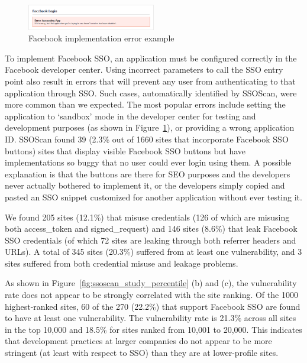 \begin{figure}[bth]
\centering
\includegraphics[width=0.5\textwidth]{figures/chapter4/ssoscan_study_FBError.png}
\caption{Facebook implementation error example}
\label{fig:ssoscan_study_FBError}
\end{figure}

 To implement Facebook SSO, an application must be configured correctly in the Facebook developer center.  Using incorrect parameters to call the SSO entry point also result in errors that will prevent any user from authenticating to that application through SSO.  Such cases, automatically identified by SSOScan, were more common than we expected.  The most popular errors include setting the application to `sandbox' mode in the developer center for testing and development purposes (as shown in Figure~\ref{fig:ssoscan_study_FBError}), or providing a wrong application ID.  SSOScan found 39 (2.3\% out of 1660 sites that incorporate Facebook SSO buttons) sites that display visible Facebook SSO buttons but have implementations so buggy that no user could ever login using them.  A possible explanation is that the buttons are there for SEO purposes and the developers never actually bothered to implement it, or the developers simply copied and pasted an SSO snippet customized for another application without ever testing it.

 We found 205 sites (12.1\%) that misuse credentials (126 of which are misusing both access\_token and signed\_request) and 146 sites (8.6\%) that leak Facebook SSO credentials (of which 72 sites are leaking through both referrer headers and URLs).  A total of 345 sites (20.3\%) suffered from at least one vulnerability, and 3 sites suffered from both credential misuse and leakage problems.

As shown in Figure~\ref{fig:ssoscan_study_percentile} (b) and (c), the vulnerability rate does not appear to be strongly correlated with the site ranking.  Of the 1000 highest-ranked sites, 60 of the 270 (22.2\%) that support Facebook SSO are found to have at least one vulnerability.  The vulnerability rate is 21.3\% across all sites in the top 10,000 and 18.5\% for sites ranked from 10,001 to 20,000.  This indicates that development practices at larger companies do not appear to be more stringent (at least with respect to SSO) than they are at lower-profile sites.


